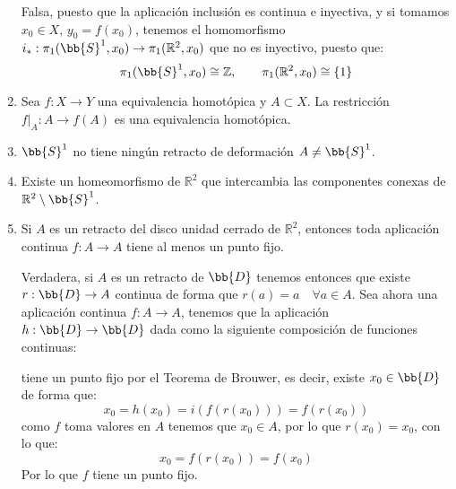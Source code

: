 \begin{ejercicio}
\begin{enumerate}[label=\alph*)]
            Falsa, puesto que la aplicación inclusión
            es continua e inyectiva, y si tomamos $x_0\in X$, $y_0 = f(x_0)$, tenemos el homomorfismo $i_\ast:\pi_1(\bb{S}^1,x_0)\to \pi_1(\mathbb{R}^2, x_0)$ que no es inyectivo, puesto que:
            \begin{equation*}
                \pi_1(\bb{S}^1,x_0) \cong \mathbb{Z}, \qquad \pi_1(\mathbb{R}^2,x_0)\cong \{1\}
            \end{equation*}
        \item Sea $f:X\to Y$ una equivalencia homotópica y $A\subset X$. La restricción $f\big|_A:A\to f(A)$ es una equivalencia homotópica.
        \item $\bb{S}^1$ no tiene ningún retracto de deformación $A\neq \bb{S}^1$.
        \item Existe un homeomorfismo de $\mathbb{R}^2$ que intercambia las componentes conexas de $\mathbb{R}^2\setminus \bb{S}^1$.
        \item Si $A$ es un retracto del disco unidad cerrado de $\mathbb{R}^2$, entonces toda aplicación continua $f:A\to A$ tiene al menos un punto fijo.

            Verdadera, si $A$ es un retracto de $\bb{D}$ tenemos entonces que existe $r:\bb{D}\to A$ continua de forma que $r(a) = a\quad \forall a\in A$. Sea ahora una aplicación continua $f:A\to A$, tenemos que la aplicación $h:\bb{D}\to \bb{D}$ dada como la siguiente composición de funciones continuas:
            \begin{figure}[H]
                \centering
            \end{figure}
            tiene un punto fijo por el Teorema de Brouwer, es decir, existe $x_0\in \bb{D}$ de forma que:
            \begin{equation*}
                x_0 = h(x_0) = i(f(r(x_0))) = f(r(x_0))
            \end{equation*}
            como $f$ toma valores en $A$ tenemos que $x_0\in A$, por lo que $r(x_0 ) =x_0$, con lo que:
            \begin{equation*}
                x_0 = f(r(x_0)) = f(x_0)
            \end{equation*}
            Por lo que $f$ tiene un punto fijo.
    \end{enumerate}
\end{ejercicio}
